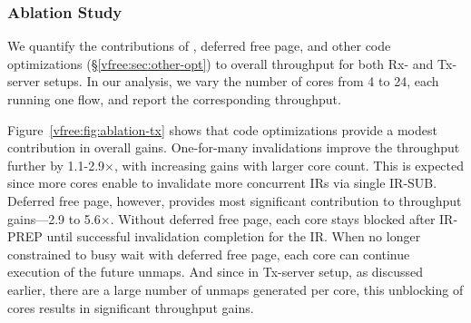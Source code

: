 \subsubsection{{\vfreename} Ablation Study}
\label{vfree:ssec:ablation}

We quantify the contributions of 
\optOne{}, deferred free page,
and other {\vfreename} code optimizations (\S\ref{vfree:sec:other-opt}) to overall throughput for both Rx- and Tx-server setups.
In our analysis, we vary the number of cores from 4 to 24, 
    each running one flow, and report the corresponding throughput.

 Figure~\ref{vfree:fig:ablation-tx} shows that code optimizations provide a modest contribution in overall gains. One-for-many invalidations improve the throughput further by {1.1-2.9$\times$}, with increasing gains with larger core count. This is expected since more cores enable {\vfreename} to invalidate more concurrent IRs via single IR-SUB. Deferred free page, however, provides most significant contribution to throughput gains---{2.9 to 5.6$\times$}. Without deferred free page, each core stays blocked after IR-PREP until successful invalidation completion for the IR. When no longer constrained to busy wait with deferred free page, each core can continue execution of the future unmaps. And since in Tx-server setup, as discussed earlier, there are a large number of unmaps generated per core, this unblocking of cores results in significant throughput gains. 





